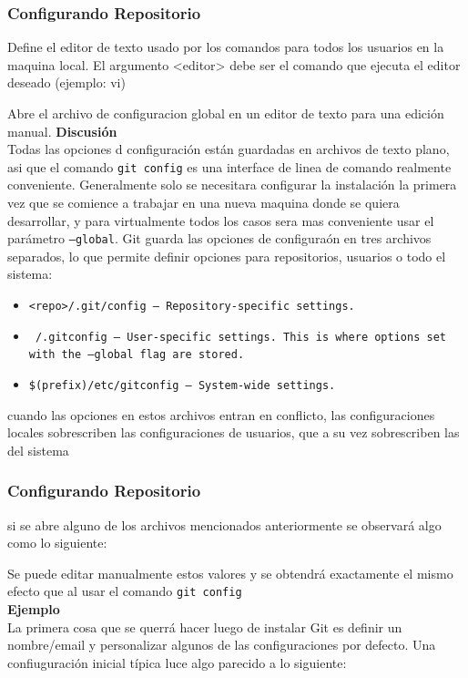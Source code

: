 \documentclass[8pt]{beamer}
\begin{document}
\begin{frame}
\frametitle{Configurando Repositorio}

Define el editor de texto usado por los comandos para todos los usuarios en la maquina local. El argumento <editor> debe ser el comando que ejecuta el editor deseado (ejemplo: vi) 

Abre el archivo de configuracion global en un editor de texto para una edici\'on manual.
\textbf{Discusi\'on}\\
\medskip
Todas las opciones d configuraci\'on est\'an guardadas en archivos de texto plano, asi que el comando \texttt{git config} es una interface de linea de comando realmente conveniente. Generalmente solo se necesitara configurar la instalaci\'on la primera vez que se comience a trabajar en una nueva maquina donde se quiera desarrollar, y para virtualmente todos los casos sera mas conveniente usar el par\'ametro \texttt{--global}. Git guarda las opciones de configura\'on en tres archivos separados, lo que permite definir opciones para repositorios, usuarios o todo el sistema:\\
\begin{itemize}
\item \texttt{<repo>/.git/config – Repository-specific settings.}
\item \texttt{~/.gitconfig – User-specific settings. This is where options set with the --global flag are stored.} 
\item \texttt{\$(prefix)/etc/gitconfig – System-wide settings.} 
\end{itemize}
cuando las opciones en estos archivos entran en conflicto, las configuraciones locales sobrescriben las configuraciones de usuarios, que a su vez sobrescriben las del sistema
\end{frame}


\begin{frame}
\frametitle{Configurando Repositorio}
si se abre alguno de los archivos mencionados anteriormente se observar\'a algo como lo
siguiente:

Se puede editar manualmente estos valores y se obtendr\'a exactamente el mismo efecto que al usar el comando \texttt{git config}\\
\medskip
\textbf{Ejemplo}\\
\medskip
La primera cosa que se querr\'a hacer luego de instalar Git es definir un nombre/email y personalizar algunos de las configuraciones por defecto. Una confiuguraci\'on inicial t\'ipica luce algo parecido a lo siguiente:



\end{frame}
\end{document}
